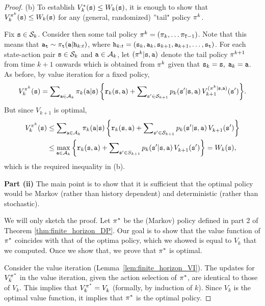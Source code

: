 \begin{proof}
(b) To establish $V_k^{*}({\tt s}) \le {W_k}({\tt s})$, it is enough
to show that $V_k^{{\pi ^k}}({\tt s}) \le {W_k}({\tt s})$ for any
(general, randomized) ''tail" policy ${\pi ^k}$.

Fix ${\tt s} \in {\mathcal{S}_k}$. Consider then some tail policy ${\pi ^k} =
({\pi _k}, \ldots {\pi_{{\tt T}-1}})$. Note that this
means that ${{\tt a}_{\tt t}} \sim {\pi_{\tt t}}({\tt a}|{{\tt h}_{k:t}})$, where ${{\tt h}_{k:t}} =
({{\tt s}_k},{{\tt a}_k},{{\tt s}_{k + 1}},{{\tt a}_{k + 1}}, \ldots
,{{\tt s}_{\tt t}})$. For each state-action pair ${\tt s} \in
{\mathcal{S}_k}$ and ${\tt a} \in {\mathcal{A}_k}$, let $({\pi
^k}|{\tt s},{\tt a})$ denote the tail policy ${\pi ^{k + 1}}$
from time $k + 1$ onwards which is obtained from ${\pi ^k}$
given that ${{\tt s}_k} = {\tt s},\;{{\tt a}_k} = {\tt a}$. As before,
by value iteration for a fixed policy,
\[V_k^{{\pi ^k}}({\tt s}) = \sum\nolimits_{{\tt a} \in {\mathcal{A}_k}} {{\pi _k}({\tt a}|{\tt s})\left\{ {{{\tt r}_k}({\tt s},{\tt a}) + \sum\nolimits_{{\tt s}' \in {\mathcal{S}_{k + 1}}} {{p_k}({\tt s}'|{\tt s},{\tt a})} \,V_{k + 1}^{({\pi ^k}|{\tt s},{\tt a})}({\tt s}')} \right\}} .\]
But since $V_{k + 1}^{}$ is optimal,
\begin{align*}
V_k^{{\pi ^k}}({\tt s}) &\le \sum\nolimits_{{\tt a} \in {\mathcal{A}_k}} {{\pi _k}({\tt a}|{\tt s})\left\{ {{{\tt r}_k}({\tt s},{\tt a}) + \sum\nolimits_{{\tt s}' \in {\mathcal{S}_{k + 1}}} {{p_k}({\tt s}'|{\tt s},{\tt a})\,} V_{k + 1}^{}({\tt s}')} \right\}} \\
 &\le {\max _{{\tt a}\in {\mathcal{A}_k}}}\left\{ {{{\tt r}_k}({\tt s},{\tt a}) + \sum\nolimits_{{\tt s}' \in {S_{k + 1}}} {{p_k}({\tt s}'|{\tt s},{\tt a})\,} V_{k + 1}^{}({\tt s}')} \right\} = {W_k}({\tt s}),
\end{align*}
which is the required inequality in (b).

\textbf{Part  (ii)} The main point is to show that it is
sufficient that the optimal policy would be Markov (rather than
history dependent) and deterministic (rather than stochastic).


We will only sketch the proof.
Let ${\pi ^*}$ be the (Markov) policy defined in part 2 of
Theorem \ref{thm:finite_horizon_DP}. Our goal is to show that the
value function of ${\pi ^*}$ coincides with that of the optima
policy, which we showed is equal to $V_k$ that we computed. Once we
show that, we prove that ${\pi ^*}$ is optimal.

Consider the value iteration (Lemma~\ref{lem:finite_horizon_VI}).
The updates for $V_k^{{\pi ^*}}$ in the value iteration, given
the action selection of $\pi^*$, are identical to those of
$V_k^{}$. This implies that $V_k^{{\pi ^*}} = V_k^{}$ (formally,
by induction of $k$). Since $V_k$ is the optimal value function, it
implies that $\pi^*$ is the optimal policy.
%
\end{proof}



